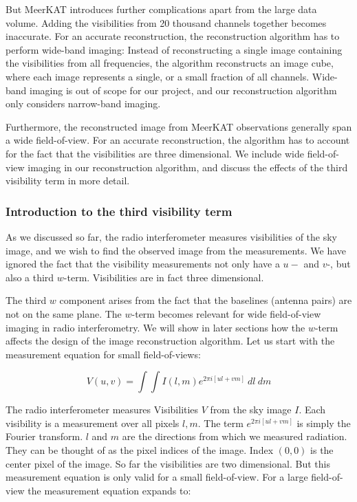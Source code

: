But MeerKAT introduces further complications apart from the large data volume. Adding the visibilities from 20 thousand channels together becomes inaccurate. For an accurate reconstruction, the reconstruction algorithm has to perform wide-band imaging: Instead of reconstructing a single image containing the visibilities from all frequencies, the algorithm reconstructs an image cube, where each image represents a single, or a small fraction of all channels. Wide-band imaging is out of scope for our project, and our reconstruction algorithm only considers narrow-band imaging.

Furthermore, the reconstructed image from MeerKAT observations generally span a wide field-of-view. For an accurate reconstruction, the algorithm has to account for the fact that the visibilities are three dimensional. We include wide field-of-view imaging in our reconstruction algorithm, and discuss the effects of the third visibility term in more detail.


\subsubsection{Introduction to the third visibility term}
As we discussed so far, the radio interferometer measures visibilities of the sky image, and we wish to find the observed image from the measurements. We have ignored the fact that the visibility measurements not only have a $u-$ and $v$-, but also a third $w$-term. Visibilities are in fact three dimensional.

The third $w$ component arises from the fact that the baselines (antenna pairs) are not on the same plane. The $w$-term becomes relevant for wide field-of-view imaging in radio interferometry. We will show in later sections how the $w$-term affects the design of the image reconstruction algorithm. Let us start with the measurement equation for small field-of-views:

\begin{equation}\label{intro2:model:smallfov}
V(u, v) = \int\int I(l, m)  e^{2 \pi i [ul+vm]} \: dl \: dm
\end{equation}

The radio interferometer measures Visibilities $V$ from the sky image $I$. Each visibility is a measurement over all pixels $l, m$. The term $ e^{2 \pi i [ul+vm]}$ is simply the Fourier transform. $l$ and $m$ are the directions from which we measured radiation. They can be thought of as the pixel indices of the image. Index $(0,0)$ is the center pixel of the image. So far the visibilities are two dimensional. But this measurement equation is only valid for a small field-of-view. For a large field-of-view the measurement equation expands to:


